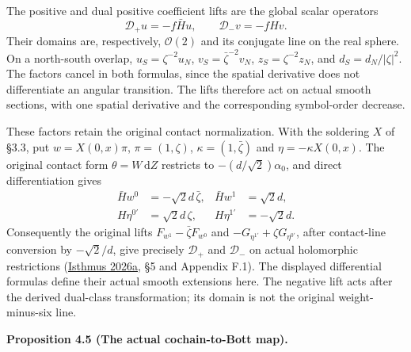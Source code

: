 \documentclass[
  english,
  11pt,
  reqno]{amsart}
\makeatletter
\newcommand{\pandocstatementheading}[1]{%
  \par\if@nobreak\else
    \addpenalty{\@beginparpenalty}%
    \addvspace{.5\baselineskip plus .2\baselineskip minus .2\baselineskip}%
  \fi
  {\normalfont\bfseries #1\par}%
  \nobreak\@afterindenttrue\@afterheading
}
\makeatother
\begin{document}
The positive and dual positive coefficient lifts are the global scalar
operators%
 \[
\mathcal D_+u=-f\bar H u,\qquad
\mathcal D_-v=-fHv.
\] Their domains are, respectively, \(\mathcal O(2)\) and its conjugate
line on the real sphere. On a north-south overlap,
\(u_S=\zeta^{-2}u_N\), \(v_S=\bar\zeta^{-2}v_N\), \(z_S=\zeta^{-2}z_N\),
and \(d_S=d_N/|\zeta|^2\). The factors cancel in both formulas, since
the spatial derivative does not differentiate an angular transition. The
lifts therefore act on actual smooth sections, with one spatial
derivative and the corresponding symbol-order decrease.

These factors retain the original contact normalization. With the
soldering \(X\) of §3.3, put \(w=X(0,x)\pi\), \(\pi=(1,\zeta)\),
\(\kappa=(1,\bar\zeta)\) and \(\eta=-\kappa X(0,x)\). The original
contact form \(\theta=W\,\mathrm dZ\) restricts to
\(-(d/\sqrt2)\alpha_0\), and direct differentiation gives%
\[
\begin{aligned}
\bar H w^0&=-\sqrt2d\,\bar\zeta,&
\bar H w^1&=\sqrt2d,\\
H\eta^{0'}&=\sqrt2d\,\zeta,&
H\eta^{1'}&=-\sqrt2d.
\end{aligned}
\] Consequently the original lifts \(F_{w^1}-\bar\zeta F_{w^0}\) and
\(-G_{\eta^{1'}}+\zeta G_{\eta^{0'}}\), after contact-line conversion by
\(-\sqrt2/d\), give precisely \(\mathcal D_+\) and \(\mathcal D_-\) on
actual holomorphic restrictions (\hyperref[ref-IsthmusLocal2026]{Isthmus
2026a}, §5 and Appendix F.1). The displayed differential formulas define
their actual smooth extensions here. The negative lift acts after the
derived dual-class transformation; its domain is not the original
weight-minus-six line.

\pandocstatementheading{\leavevmode{}\label{prop:online-actual-contact-cochain-map}Proposition 4.5 (The actual cochain-to-Bott map).}
\end{document}
